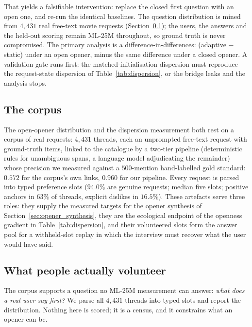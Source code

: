 \documentclass[11pt]{article}
\begin{document}
That yields a falsifiable intervention: replace the closed first question with an open one, and
re-run the identical baselines. The question distribution is mined from $4{,}431$ real free-text
movie requests (Section~\ref{sec:reddit}); the users, the answers and the held-out scoring remain
ML-25M throughout, so ground truth is never compromised. The primary analysis is a
difference-in-differences: (adaptive $-$ static) under an open opener, minus the same difference
under a closed opener. A validation gate runs first: the matched-initialisation dispersion must
reproduce the request-state dispersion of Table~\ref{tab:dispersion}, or the bridge leaks and the
analysis stops.

\subsection{The corpus}
\label{sec:reddit}

The open-opener distribution and the dispersion measurement both rest on a corpus of real requests:
$4{,}431$ threads, each an unprompted free-text request with ground-truth items, linked to the
catalogue by a two-tier pipeline (deterministic rules for unambiguous spans, a language model
adjudicating the remainder) whose precision we measured against a $500$-mention hand-labelled gold
standard: $0.572$ for the corpus's own links, $0.960$ for our pipeline. Every request is parsed into
typed preference slots ($94.0\%$ are genuine requests; median five slots; positive anchors in
$63\%$ of threads, explicit dislikes in $16.5\%$). These artefacts serve three roles: they supply
the measured targets for the opener synthesis of Section~\ref{sec:opener_synthesis}, they are the
ecological endpoint of the openness gradient in Table~\ref{tab:dispersion}, and their volunteered slots form the answer pool for a withheld-slot
replay in which the interview must recover what the user would have said. 

\subsection{What people actually volunteer}
\label{sec:opener_census}

The corpus supports a question no ML-25M measurement can answer: \emph{what does a real user say
first?} We parse all $4{,}431$ threads into typed slots and report the distribution. Nothing here is
scored; it is a census, and it constrains what an opener can be.
\end{document}
